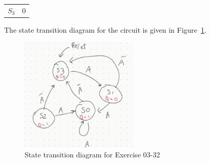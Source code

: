 \documentclass[12pt]{article}
\newenvironment{sol}[1][Solution]{\begin{trivlist}
		\item[\hskip \labelsep {\bfseries #1:}]}{\end{trivlist}}
\begin{document}
\begin{sol}
\begin{center}
\begin{tabular}{c|c}
			$S_3$ & $0$\\
		\end{tabular}
	\end{center}
	The state transition diagram for the circuit is given in Figure~\ref{03-32-state-transition-diagram}.
	\begin{figure}
		\centering
		\includegraphics[width=0.5\textwidth]{03-32-state-transition-diagram}
		\caption{State transition diagram for Exercise 03-32}
		\label{03-32-state-transition-diagram}
	\end{figure}
\end{sol}
\end{document}
